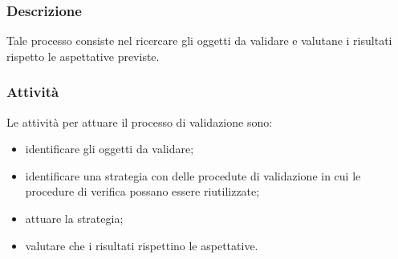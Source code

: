         \subsubsection{Descrizione}
        Tale processo consiste nel ricercare gli oggetti da validare e valutane i risultati rispetto le aspettative previste.
        \subsubsection{Attività}
        Le attività per attuare il processo di validazione sono:
        \begin{itemize}
            \item identificare gli oggetti da validare;
            \item identificare una strategia con delle procedute di validazione in cui le procedure di verifica possano essere riutilizzate;
            \item attuare la strategia;
            \item valutare che i risultati rispettino le aspettative.
        \end{itemize}
